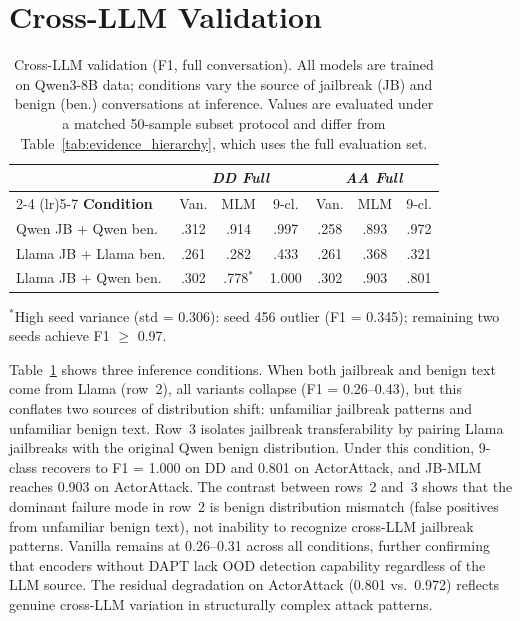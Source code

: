 \section{Cross-LLM Validation}
\label{app:cross_llm}

\begin{table}[ht]
\centering
\footnotesize
\caption{Cross-LLM validation (F1, full conversation). All models are trained on Qwen3-8B data; conditions vary the source of jailbreak (JB) and benign (ben.) conversations at inference. Values are evaluated under a matched 50-sample subset protocol and differ from Table~\ref{tab:evidence_hierarchy}, which uses the full evaluation set.}
\label{tab:cross_llm}
\begin{tabular}{@{}lcccccc@{}}
\toprule
& \multicolumn{3}{c}{\textit{DD Full}} & \multicolumn{3}{c}{\textit{AA Full}} \\
\cmidrule(lr){2-4} \cmidrule(lr){5-7}
\textbf{Condition} & Van. & MLM & 9-cl. & Van. & MLM & 9-cl. \\
\midrule
Qwen JB + Qwen ben. & .312 & .914 & .997 & .258 & .893 & .972 \\
Llama JB + Llama ben. & .261 & .282 & .433 & .261 & .368 & .321 \\
Llama JB + Qwen ben. & .302 & .778$^{*}$ & 1.000 & .302 & .903 & .801 \\
\bottomrule
\end{tabular}
\vspace{-2pt}
{\footnotesize $^{*}$High seed variance (std = 0.306): seed 456 outlier (F1 = 0.345); remaining two seeds achieve F1 $\geq$ 0.97.}
\end{table}

Table~\ref{tab:cross_llm} shows three inference conditions. When both jailbreak and benign text come from Llama (row~2), all variants collapse (F1 = 0.26--0.43), but this conflates two sources of distribution shift: unfamiliar jailbreak patterns and unfamiliar benign text. Row~3 isolates jailbreak transferability by pairing Llama jailbreaks with the original Qwen benign distribution. Under this condition, 9-class recovers to F1 = 1.000 on DD and 0.801 on ActorAttack, and JB-MLM reaches 0.903 on ActorAttack. The contrast between rows~2 and~3 shows that the dominant failure mode in row~2 is benign distribution mismatch (false positives from unfamiliar benign text), not inability to recognize cross-LLM jailbreak patterns. Vanilla remains at 0.26--0.31 across all conditions, further confirming that encoders without DAPT lack OOD detection capability regardless of the LLM source. The residual degradation on ActorAttack (0.801 vs.\ 0.972) reflects genuine cross-LLM variation in structurally complex attack patterns.

